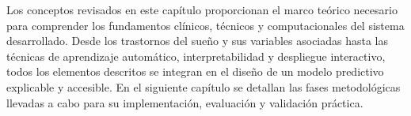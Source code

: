 \noindent
Los conceptos revisados en este capítulo proporcionan el marco teórico necesario para comprender los fundamentos clínicos, técnicos y computacionales del sistema desarrollado. Desde los trastornos del sueño y sus variables asociadas hasta las técnicas de aprendizaje automático, interpretabilidad y despliegue interactivo, todos los elementos descritos se integran en el diseño de un modelo predictivo explicable y accesible. En el siguiente capítulo se detallan las fases metodológicas llevadas a cabo para su implementación, evaluación y validación práctica.
